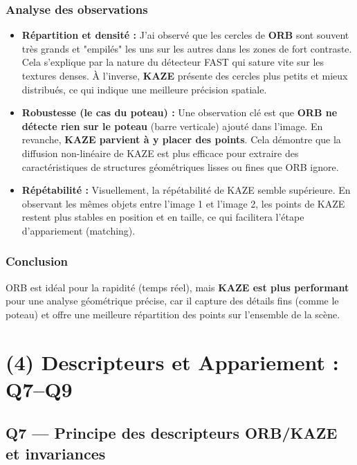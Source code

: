 \documentclass[11pt,a4paper]{article}
\begin{document}
\subsubsection{Analyse des observations}

\begin{itemize}
    \item \textbf{Répartition et densité :} J'ai observé que les cercles de \textbf{ORB} sont souvent très grands et "empilés" les uns sur les autres dans les zones de fort contraste. Cela s'explique par la nature du détecteur FAST qui sature vite sur les textures denses. À l'inverse, \textbf{KAZE} présente des cercles plus petits et mieux distribués, ce qui indique une meilleure précision spatiale.
    
    \item \textbf{Robustesse (le cas du poteau) :} Une observation clé est que \textbf{ORB ne détecte rien sur le poteau} (barre verticale) ajouté dans l'image. En revanche, \textbf{KAZE parvient à y placer des points}. Cela démontre que la diffusion non-linéaire de KAZE est plus efficace pour extraire des caractéristiques de structures géométriques lisses ou fines que ORB ignore.
    
    \item \textbf{Répétabilité :} Visuellement, la répétabilité de KAZE semble supérieure. En observant les mêmes objets entre l'image 1 et l'image 2, les points de KAZE restent plus stables en position et en taille, ce qui facilitera l'étape d'appariement (matching).
\end{itemize}

\subsubsection{Conclusion}
ORB est idéal pour la rapidité (temps réel), mais \textbf{KAZE est plus performant} pour une analyse géométrique précise, car il capture des détails fins (comme le poteau) et offre une meilleure répartition des points sur l'ensemble de la scène.
\section{(4) Descripteurs et Appariement : Q7--Q9}

\subsection{Q7 --- Principe des descripteurs ORB/KAZE et invariances}
\end{document}
